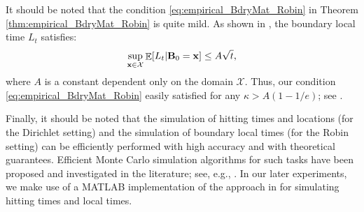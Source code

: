 \documentclass[aos,preprint]{imsart}
\theoremstyle{plain}
\DeclareMathOperator{\E}{\mathbb E}
\newcommand{\CalX}{\mathcal X}
\newcommand{\Bx}{\bold x}
\newcommand{\BFx}{\bold x}
\newcommand{\Bu}{\bold u}
\newcommand{\cmtS}[1]{{\color{red}{(Simon: #1)}}}
\theoremstyle{remark}
\begin{document}
It should be noted that the condition \eqref{eq:empirical_BdryMat_Robin} in Theorem \ref{thm:empirical_BdryMat_Robin} is quite mild. As shown in \cite{hsu1984reflecting,hsu1985probabilistic}, the boundary local time \( L_t \) satisfies:
\[
\sup_{\BFx \in \CalX} \E[L_t | \bold{B}_0 = \BFx] \leq A\sqrt{t},
\]
where \( A \) is a constant dependent only on the domain \( \CalX \). Thus, our condition \eqref{eq:empirical_BdryMat_Robin} easily satisfied for any \( \kappa > {A}(1 - 1/e) \); see \citep{grebenkov2019probability}. 


Finally, it should be noted that the simulation of hitting times and locations (for the Dirichlet setting) and the simulation of boundary local times (for the Robin setting) can be efficiently performed with high accuracy and with theoretical guarantees. Efficient Monte Carlo simulation algorithms for such tasks have been proposed and investigated in the literature; see, e.g., \cite{roger_RSDE,milstein2004stochastic,leimkuhler2023simplest}. In our later experiments, we make use of a MATLAB implementation of the approach in \cite{milstein2004stochastic} for simulating hitting times and local times.



\end{document}
